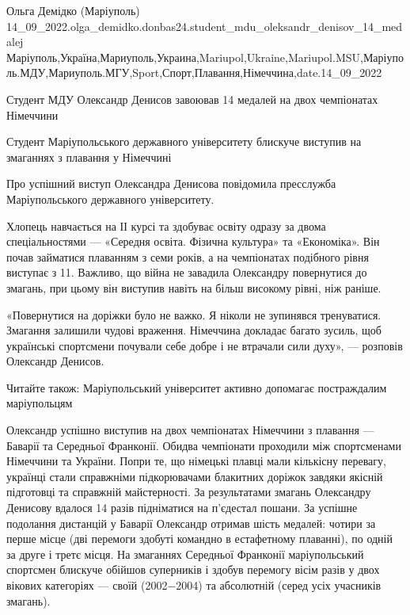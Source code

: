  
 
 
 
 

Ольга Демідко (Маріуполь)
14_09_2022.olga_demidko.donbas24.student_mdu_oleksandr_denisov_14_medalej
Маріуполь,Україна,Мариуполь,Украина,Mariupol,Ukraine,Mariupol.MSU,Маріуполь.МДУ,Мариуполь.МГУ,Sport,Спорт,Плавання,Німеччина,date.14_09_2022

Студент МДУ Олександр Денисов завоював 14 медалей на двох чемпіонатах Німеччини

Студент Маріупольського державного університету блискуче виступив на змаганнях
з плавання у Німеччині

Про успішний виступ Олександра Денисова повідомила пресслужба Маріупольського
державного університету.

Хлопець навчається на ІІ курсі та здобуває освіту одразу за двома
спеціальностями — «Середня освіта. Фізична культура» та «Економіка». Він почав
займатися плаванням з семи років, а на чемпіонатах подібного рівня виступає з
11. Важливо, що війна не завадила Олександру повернутися до змагань, при цьому
він виступив навіть на більш високому рівні, ніж раніше.

«Повернутися на доріжки було не важко. Я ніколи не зупинявся тренуватися.
Змагання залишили чудові враження. Німеччина докладає багато зусиль, щоб
українські спортсмени почували себе добре і не втрачали сили духу», — розповів
Олександр Денисов.

Читайте також: Маріупольський університет активно допомагає постраждалим
маріупольцям

Олександр успішно виступив на двох чемпіонатах Німеччини з плавання — Баварії
та Середньої Франконії. Обидва чемпіонати проходили між спортсменами Німеччини
та України. Попри те, що німецькі плавці мали кількісну перевагу, українці
стали справжніми підкорювачами блакитних доріжок завдяки якісній підготовці та
справжній майстерності. За результатами змагань Олександру Денисову вдалося 14
разів підніматися на п'єдестал пошани. За успішне подолання дистанцій у Баварії
Олександр отримав шість медалей: чотири за перше місце (дві перемоги здобуті
командно в естафетному плаванні), по одній за друге і третє місця. На змаганнях
Середньої Франконії маріупольський спортсмен блискуче обійшов суперників і
здобув перемогу вісім разів у двох вікових категоріях — своїй (2002−2004) та
абсолютній (серед усіх учасників змагань).

